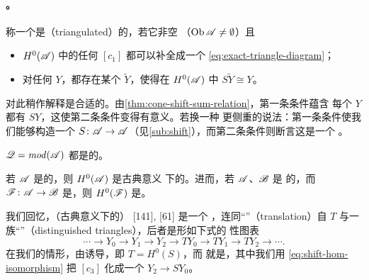 \paragraph{\trTriangulated\trACategory。}\label{sub:triangulated-categories}
称一个\trACategory{}是\textbf{\trTriangulated}（triangulated）的，若它非空%
（$\operatorname{Ob}\mathscr{A}\ne\emptyset$）且
\begin{itemize}
\item $H^0(\mathscr{A})$ 中的任何\trMorphism{} $[c_1]$ 都可以补全成一个%
\trExactTriangle{} \eqref{eq:exact-triangle-diagram}；
\item 对任何\trObject{} $Y$，都存在某个 $\widetilde{Y}$，使得在
$H^0(\mathscr{A})$ 中 $S\widetilde{Y}\cong Y$。
\end{itemize}
对此稍作解释是合适的。由\cref{thm:cone-shift-sum-relation}，第一条条件蕴含%
每个\trObject{} $Y$ 都有\trSuspension{} $SY$，这使第二条条件变得有意义。若换一种
更侧重\trFunctor{}的说法：第一条条件使我们能够构造一个\trShiftFunctor{}%
$S\colon\mathscr{A}\to\mathscr{A}$（见\cref{sub:shift}），而第二条条件则断言这是一个%
\trQuasiequivalence。

\begin{example}\label{thm:mod-categories-triangulated}
\trACategory{} $\mathscr{Q}=\mathit{mod}(\mathscr{A})$ 都是\trTriangulated{}的。
\end{example}

\begin{proposition}\label{thm:h0-triangulated-category}
若\trACategory{} $\mathscr{A}$ 是\trTriangulated{}的，则 $H^0(\mathscr{A})$ 是古典意义
下的\trTriangulated\trCategory。进而，若\trACategory{} $\mathscr{A}$、$\mathscr{B}$ 是%
\trTriangulated{}的，而 $\mathscr{F}\colon\mathscr{A}\to\mathscr{B}$ 是\trAFunctor，则
$H^0(\mathscr{F})$ 是\trExact{}\trFunctor。
\end{proposition}

我们回忆，（古典意义下的）\trTriangulated\trCategory{} [141], [61] 是一个%
\trAdditive\trCategory，连同“\trTranslation”（translation）自\trEquivalence{} $T$
与一族“\trDistinguishedTriangle”（distinguished triangles），后者是形如下式的%
\trPeriodic{}性图表
\begin{equation*}
\cdots\longrightarrow Y_0\longrightarrow Y_1\longrightarrow Y_2
\longrightarrow TY_0\longrightarrow TY_1\longrightarrow TY_2
\longrightarrow\cdots.
\end{equation*}
在我们的情形，\trTranslation{}由\trShiftFunctor{}诱导，即 $T=H^0(S)$，而%
\trDistinguishedTriangle{}就是\trExactTriangle，其中我们用
\eqref{eq:shift-hom-isomorphism} 把 $[c_3]$ 化成一个\trMorphism{}%
$Y_2\to SY_0$。
